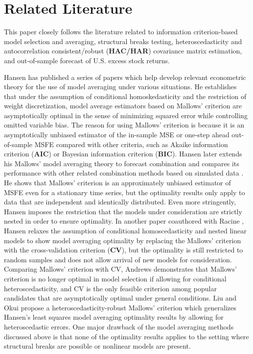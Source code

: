 \section{Related Literature}
This paper closely follows the literature related to information criterion-based model selection and averaging, structural breaks testing, heteroscedasticity and autocorrelation consistent/robust (\textbf{HAC/HAR}) covariance matrix estimation, and out-of-sample forecast of U.S. excess stock returns.

Hansen has published a series of papers \cite{hansen_EMETRICA2007} \cite{hansen_JE2008} \cite{hansen2009averaging} \cite{hansen2011jackknife} which help develop relevant econometric theory for the use of model averaging under various situations. He establishes that under the assumption of conditional homoskedasticity and the restriction of weight discretization, model average estimators based on Mallows' criterion are asymptotically optimal in the sense of minimizing squared error while controlling omitted variable bias. The reason for using Mallows' criterion is because it is an asymptotically unbiased estimator of the in-sample MSE or one-step ahead out-of-sample MSFE compared with other criteria, such as Akaike information criterion (\textbf{AIC}) or Bayesian information criterion (\textbf{BIC}). Hansen later extends his Mallows' model averaging theory to forecast combination and compares its performance with other related combination methods based on simulated data \cite{hansen_JE2008}. He shows that Mallows' criterion is an approximately unbiased estimator of MSFE even for a stationary time series, but the optimality results only apply to data that are independent and identically distributed. Even more stringently, Hansen imposes the restriction that the models under consideration are strictly nested in order to ensure optimality. In another paper coauthored with Racine \cite{hansen2011jackknife}, Hansen relaxes the assumption of conditional homoscedasticity and nested linear models to show model averaging optimality by replacing the Mallows' criterion with the cross-validation criterion (\textbf{CV}), but the optimality is still restricted to random samples and does not allow arrival of new models for consideration. Comparing Mallows' criterion with CV, Andrews \cite{andrews_JE1991} demonstrates that Mallows' criterion is no longer optimal in model selection if allowing for conditional heteroscedasticity, and CV is the only feasible criterion among popular candidates that are asymptotically optimal under general conditions. Liu and Okui \cite{liu_okui2012} propose a heteroscedasticity-robust Mallows' criterion which generalizes Hansen's least squares model averaging optimality results by allowing for heteroscedastic errors. One major drawback of the model averaging methods discussed above is that none of the optimality results applies to the setting where structural breaks are possible or nonlinear models are present.

